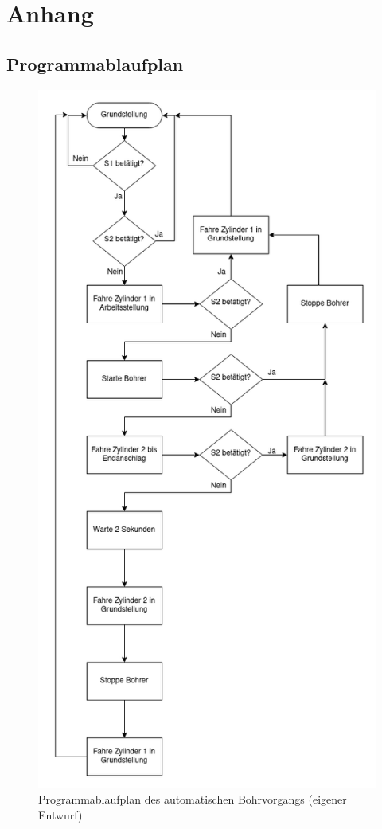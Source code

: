 \section*{Anhang}
\renewcommand{\thesubsection}{\Alph{subsection}}

\subsection{Programmablaufplan\label{anhang:pap}}
\begin{figure}[H]
   \centering
    \includegraphics[scale=0.5]{Bilder/Flow_Chart_Bohrvorrichtung.png}
    \caption[gesamter Programmablaufplan]{Programmablaufplan des automatischen Bohrvorgangs (eigener Entwurf)}
    \label{fig:Ablaufplan}
\end{figure}
\clearpage

